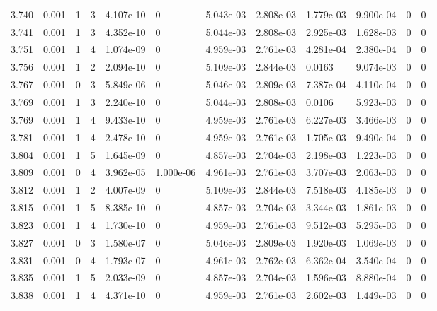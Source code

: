 \documentclass[preview]{standalone}
\begin{document}
{{{{{\begin{tabular}{L{1.2cm}C{1.2cm} C{0.3cm}C{0.5cm} C{1.4cm}C{1.4cm} C{1.4cm}C{1.4cm} C{1.6cm}C{1.6cm} C{1.6cm}C{1.6cm}}
  3.740  &  0.001  & 1     &  3 &  4.107e-10  & 0  &  5.043e-03&   2.808e-03& 1.779e-03 & 9.900e-04   &  0 & 0  \\ 
  3.741  &  0.001  & 1     &  3 &  4.352e-10  & 0  &  5.044e-03&   2.808e-03& 2.925e-03 & 1.628e-03   &  0 & 0  \\ 
  3.751  &  0.001  & 1     &  4 &  1.074e-09  & 0  &  4.959e-03&   2.761e-03& 4.281e-04 & 2.380e-04   &  0 & 0  \\ 
  3.756  &  0.001  & 1     &  2 &  2.094e-10  & 0  &  5.109e-03&   2.844e-03& 0.0163 & 9.074e-03   &  0 & 0  \\ 
  3.767  &  0.001  & 0     &  3 &  5.849e-06  & 0  &  5.046e-03&   2.809e-03& 7.387e-04 & 4.110e-04   &  0 & 0  \\ 
  3.769  &  0.001  & 1     &  3 &  2.240e-10  & 0  &  5.044e-03&   2.808e-03& 0.0106 & 5.923e-03   &  0 & 0  \\ 
  3.769  &  0.001  & 1     &  4 &  9.433e-10  & 0  &  4.959e-03&   2.761e-03& 6.227e-03 & 3.466e-03   &  0 & 0  \\ 
  3.781  &  0.001  & 1     &  4 &  2.478e-10  & 0  &  4.959e-03&   2.761e-03& 1.705e-03 & 9.490e-04   &  0 & 0  \\ 
  3.804  &  0.001  & 1     &  5 &  1.645e-09  & 0  &  4.857e-03&   2.704e-03& 2.198e-03 & 1.223e-03   &  0 & 0  \\ 
  3.809  &  0.001  & 0     &  4 &  3.962e-05  & 1.000e-06  &  4.961e-03&   2.761e-03& 3.707e-03 & 2.063e-03   &  0 & 0  \\ 
  3.812  &  0.001  & 1     &  2 &  4.007e-09  & 0  &  5.109e-03&   2.844e-03& 7.518e-03 & 4.185e-03   &  0 & 0  \\ 
  3.815  &  0.001  & 1     &  5 &  8.385e-10  & 0  &  4.857e-03&   2.704e-03& 3.344e-03 & 1.861e-03   &  0 & 0  \\ 
  3.823  &  0.001  & 1     &  4 &  1.730e-10  & 0  &  4.959e-03&   2.761e-03& 9.512e-03 & 5.295e-03   &  0 & 0  \\ 
  3.827  &  0.001  & 0     &  3 &  1.580e-07  & 0  &  5.046e-03&   2.809e-03& 1.920e-03 & 1.069e-03   &  0 & 0  \\ 
  3.831  &  0.001  & 0     &  4 &  1.793e-07  & 0  &  4.961e-03&   2.762e-03& 6.362e-04 & 3.540e-04   &  0 & 0  \\ 
  3.835  &  0.001  & 1     &  5 &  2.033e-09  & 0  &  4.857e-03&   2.704e-03& 1.596e-03 & 8.880e-04   &  0 & 0  \\ 
  3.838  &  0.001  & 1     &  4 &  4.371e-10  & 0  &  4.959e-03&   2.761e-03& 2.602e-03 & 1.449e-03   &  0 & 0  \\ 

\end{tabular}}}}}}
\end{document}
